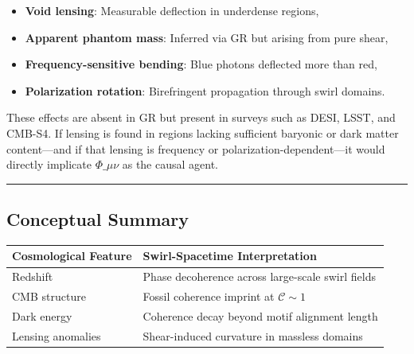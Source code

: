 \documentclass[
  11pt,
]{article}
\providecommand{\tightlist}{%
  \setlength{\itemsep}{0pt}\setlength{\parskip}{0pt}}
\begin{document}
\begin{itemize}
\tightlist
\item
  \textbf{Void lensing}: Measurable deflection in underdense regions,
\item
  \textbf{Apparent phantom mass}: Inferred via GR but arising from pure
  shear,
\item
  \textbf{Frequency-sensitive bending}: Blue photons deflected more than
  red,
\item
  \textbf{Polarization rotation}: Birefringent propagation through swirl
  domains.
\end{itemize}

These effects are absent in GR but present in surveys such as DESI,
LSST, and CMB-S4. If lensing is found in regions lacking sufficient
baryonic or dark matter content---and if that lensing is frequency or
polarization-dependent---it would directly implicate \(\Phi\_{\mu\nu}\)
as the causal agent.

\begin{center}\rule{0.5\linewidth}{0.5pt}\end{center}

\subsection{Conceptual Summary}\label{conceptual-summary}

\begin{longtable}[]{@{}
  >{\raggedright\arraybackslash}p{}
  >{\raggedright\arraybackslash}p{}@{}}
\toprule\noalign{}
\begin{minipage}[b]{\linewidth}\raggedright
Cosmological Feature
\end{minipage} & \begin{minipage}[b]{\linewidth}\raggedright
Swirl-Spacetime Interpretation
\end{minipage} \\
\midrule\noalign{}
\endhead
\bottomrule\noalign{}
\endlastfoot
Redshift & Phase decoherence across large-scale swirl fields \\
CMB structure & Fossil coherence imprint at \(\mathcal{C} \sim 1\) \\
Dark energy & Coherence decay beyond motif alignment length \\
Lensing anomalies & Shear-induced curvature in massless domains \\
\end{longtable}
\end{document}
